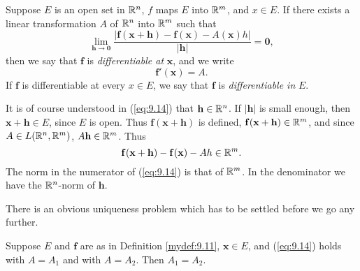 \begin{mydef}
    \label{mydef:9.11}
    Suppose $E$ is an open set in ${\protect\mathbb R}^n$, $f$ maps $E$ into ${\protect\mathbb R}^m$, and $x \in E$.
    If there exists a linear transformation $A$ of ${\protect\mathbb R}^n$ into ${\protect\mathbb R}^m$ such that
    \begin{equation}
        \label{eq:9.14}
        \lim_{\mathbf{h} \to \mathbf{0}} \frac{\left| \mathbf{f}\mathbf{(x+h)} - \mathbf{f}\mathbf{(x)} - A\mathbf{(x)}h \right|}{\left| \mathbf{h} \right|} = \mathbf{0},
    \end{equation}
    then we say that $\mathbf{f}$ is \emph{differentiable at} $\mathbf{x}$, and we write
    \begin{equation}
        \label{eq:9.15}
        \mathbf{f}'(\mathbf{x}) = A.
    \end{equation}
    If $\mathbf{f}$ is differentiable at every $x \in E$, 
    we say that $\mathbf{f}$ is \emph{differentiable in} $E$.
\end{mydef}

It is of course understood in (\ref{eq:9.14}) that $\mathbf{h} \in {\protect\mathbb R}^n$. 
If $\left| \mathbf{h} \right|$ is small enough, 
then $\mathbf{x+h} \in E$, since $E$ is open. 
Thus $\mathbf{f(x + h)}$ is defined, $\mathbf{f(x + h)} \in {\protect\mathbb R}^m$, 
and since $A \in L({\protect\mathbb R}^n, {\protect\mathbb R}^m)$, $A \mathbf{h} \in {\protect\mathbb R}^m$. 
Thus
\begin{equation*}
    \mathbf{f(x + h)} - \mathbf{f(x)} - A{h} \in {\protect\mathbb R}^m.
\end{equation*}
The norm in the numerator of (\ref{eq:9.14}) is that of ${\protect\mathbb R}^m$. 
In the denominator we have the ${\protect\mathbb R}^n$-norm of $\mathbf{h}$.

There is an obvious uniqueness problem which has to be settled before we go any further.

\begin{thm}
    \label{thm:9.12}
    Suppose $E$ and $\mathbf{f}$ are as in Definition \ref{mydef:9.11}, 
    $\mathbf{x} \in E$, and (\ref{eq:9.14}) holds with $A = A_1$ and with $A = A_2$. 
    Then $A_1 = A_2$.
\end{thm}


